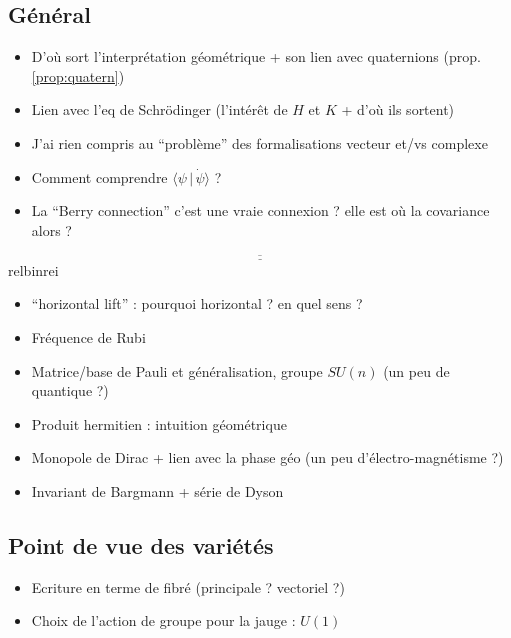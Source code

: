 \subsection{Général}

\begin{itemize}
	\item D'où sort l'interprétation géométrique + son lien avec quaternions (prop. \ref{prop:quatern})
	\item Lien avec l'eq de Schrödinger (l'intérêt de $H$ et $K$ + d'où ils sortent)
	\item J'ai rien compris au ``problème'' des formalisations vecteur et/vs complexe
	\item Comment comprendre $\big\langle \psi\, |\, \dot{\psi} \big\rangle$ ?
	
	\item La ``Berry connection'' c'est une vraie connexion ? elle est où la covariance alors ?
\end{itemize}

\[\underline{\overline{\qquad\qquad\qquad\qquad\qquad\qquad\qquad\qquad\qquad\qquad\qquad\qquad\qquad\qquad\qquad\qquad\qquad\qquad}}\]{\color{white}relbinrei}

\begin{itemize}
	\item ``horizontal lift'' : pourquoi horizontal ? en quel sens ?
	\item Fréquence de Rubi
	\item Matrice/base de Pauli et généralisation, groupe $SU(n)$ (un peu de quantique ?)
	\item Produit hermitien : intuition géométrique
	\item Monopole de Dirac + lien avec la phase géo (un peu d'électro-magnétisme ?)
	\item Invariant de Bargmann + série de Dyson
\end{itemize}



\subsection{Point de vue des variétés}\label{subsec:phaseG_variete}

\begin{itemize}
	\item Ecriture en terme de fibré (principale ? vectoriel ?)
	
	\item Choix de l'action de groupe pour la jauge : $U(1)$ \apriori
\end{itemize}


